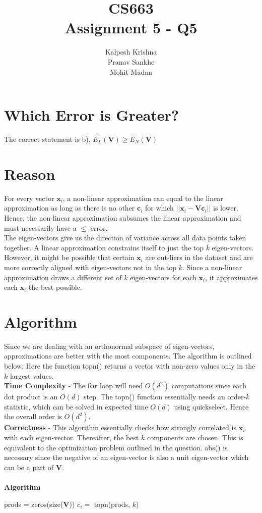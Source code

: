 \documentclass[11pt]{article}
\title{\textbf{CS663 \\ Assignment 5 - Q5}}
\author{Kalpesh Krishna\\ Pranav Sankhe \\ Mohit Madan}
\date{}
\begin{document}
\maketitle
\section{Which Error is Greater?}
The correct statement is b), $E_L(\mathbf{V}) \geq E_N(\mathbf{V})$
\section{Reason}
For every vector $\mathbf{x}_i$, a non-linear approximation can equal to the linear approximation as long as there is no other $\mathbf{c}_i$ for which $||\mathbf{x}_i - \mathbf{V}\mathbf{c}_i||$ is lower. Hence, the non-linear approximation subsumes the linear approximation and must necessarily have a $\leq$ error.\\
The eigen-vectors give us the direction of variance across all data points taken together. A linear approximation constrains itself to just the top $k$ eigen-vectors. However, it might be possible that certain $\textbf{x}_i$ are out-liers in the dataset and are more correctly aligned with eigen-vectors not in the top $k$. Since a non-linear approximation draws a different set of $k$ eigen-vectors for each $\mathbf{x}_i$, it approximates each $\textbf{x}_i$ the best possible.
\section{Algorithm}
Since we are dealing with an orthonormal subspace of eigen-vectors, approximations are better with the most components. The algorithm is outlined below. Here the function topn() returns a vector with non-zero values only in the $k$ largest values.\\
\textbf{Time Complexity} - The \textbf{for} loop will need $O(d^2)$ computations since each dot product is an $O(d)$ step. The topn() function essentially needs an order-$k$ statistic, which can be solved in expected time $O(d)$ using quickselect. Hence the overall order is $O(d^2)$.\\
\textbf{Correctness} - This algorithm essentially checks how strongly correlated is $\mathbf{x}_i$ with each eigen-vector. Thereafter, the best $k$ components are chosen. This is equivalent to the optimization problem outlined in the question. abs() is necessary since the negative of an eigen-vector is also a unit eigen-vector which can be a part of $\textbf{V}$.\\\\
\textbf{Algorithm}\\
\begin{algorithm}[H]
\SetAlgoLined
{}
 prods = zeros(size($\mathbf{V}$))\;
$c_i = $ topn(prods, $k$)\;
\end{algorithm}
\end{document}
